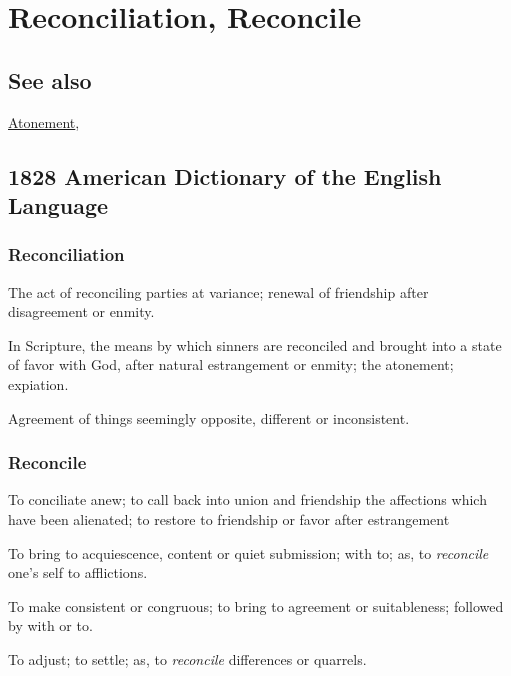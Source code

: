 \section{Reconciliation, Reconcile}
	\label{RECONCILIATION}
	
\subsection{See also}

	\hyperref[ATONEMENT]{Atonement},

\subsection{1828 American Dictionary of the English Language} %
	\label{RECONCILIATION-1828}
	
	\subsubsection{Reconciliation}

		\begin{compactitem}
			\item[1] The act of reconciling parties at variance; renewal of friendship after disagreement or enmity.
			\item[2] In Scripture, the means by which sinners are reconciled and brought into a state of favor with God, after natural estrangement or enmity; the atonement; expiation.
			\item[3] Agreement of things seemingly opposite, different or inconsistent.
		\end{compactitem}
		
	\subsubsection{Reconcile}
	
		\begin{compactitem}
			\item[1] To conciliate anew; to call back into union and friendship the affections which have been alienated; to restore to friendship or favor after estrangement
			\item[2] To bring to acquiescence, content or quiet submission; with to; as, to \textit{reconcile} one's self to afflictions.
			\item[3] To make consistent or congruous; to bring to agreement or suitableness; followed by with or to.
			\item[4] To adjust; to settle; as, to \textit{reconcile} differences or quarrels.
		\end{compactitem}

